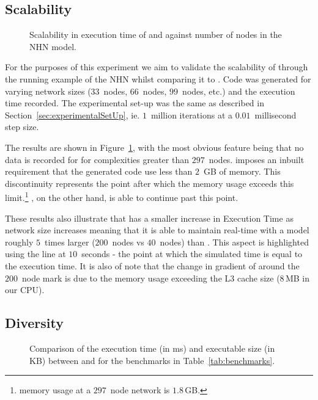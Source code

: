 \subsection{Scalability}

\begin{figure}[htbp]
  \centering
  
  \caption{Scalability in  execution time of \simulink and \ourTool against 
  number of nodes in the \acf{NHN} model.}
  \label{fig:scalability}
\end{figure}

For the purposes of this experiment we aim to validate the scalability of
\ourTool through the running example of the \ac{NHN} whilst comparing it
to \simulink.  Code was generated for varying network sizes ($33$~nodes,
$66$~nodes, $99$~nodes, etc.) and the execution time recorded.  The
experimental set-up was the same as described in
Section~\ref{sec:experimentalSetUp}, ie. $1$~million iterations at a
$0.01$~millisecond step size.

The results are shown in Figure~\ref{fig:scalability}, with the most
obvious feature being that no data is recorded for \simulink for
complexities greater than $297$~nodes.  \simulink imposes an inbuilt
requirement that the generated code use less than $2$~GB of memory. This
discontinuity represents the point after which the memory usage exceeds
this limit.\footnote{\simulink memory usage at a $297$~node network is 
$1.8$\,GB.}  \ourTool, on the other hand, is able to continue past this
point.

These results also illustrate that \ourTool has a smaller increase in
Execution Time as network size increases meaning that it is able to
maintain real-time with a model roughly $5$~times larger ($200$~nodes vs
$40$~nodes) than \simulink.  This aspect is highlighted using the line at 
$10$~seconds - the point at which the simulated time is equal to the execution 
time.  It is also of note that the change in gradient of \ourTool around the 
$200$~node mark is due to the memory usage exceeding the L$3$ cache size 
($8$\,MB in our CPU).


\subsection{Diversity}
\label{sec:diversity}

\begin{figure}[htbp]
  \centering
  \caption{Comparison of the execution time (in ms) and executable size
    (in KB) between \simulink and \ourTool for the benchmarks in
    Table~\ref{tab:benchmarks}.}
  \label{fig:results}
\end{figure}

